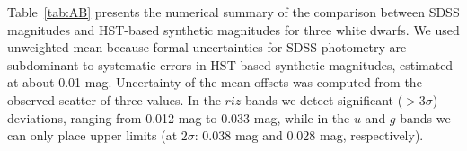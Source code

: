 \documentclass[fleqn,usenatbib]{mnras}
\begin{document}


Table~\ref{tab:AB} presents the numerical summary of the comparison between SDSS magnitudes 
and HST-based synthetic magnitudes for three white dwarfs. We used unweighted mean because 
formal uncertainties for SDSS photometry are subdominant to systematic errors in HST-based
synthetic magnitudes, estimated at about 0.01 mag. Uncertainty of the mean offsets was 
computed from the observed scatter of three values. In the $riz$ bands we detect significant
($>3\sigma$) deviations, ranging from 0.012 mag to 0.033 mag, while in the $u$ and $g$ bands 
we can only place upper limits (at $2\sigma$: 0.038 mag and 0.028 mag, respectively). 

\end{document}
